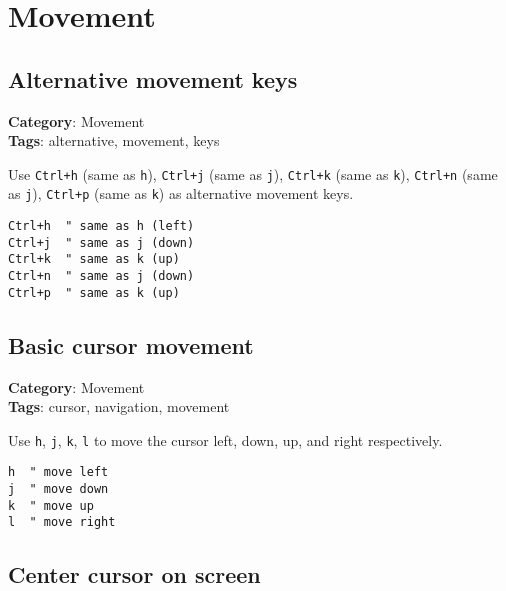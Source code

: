{{{{{{{\chapter{Movement}
\section{Alternative movement keys}

\textbf{Category}: Movement\\ \textbf{Tags}: alternative, movement, keys
\vspace{0.5cm}

Use {\footnotesize \Verb§Ctrl+h§} (same as {\footnotesize \Verb§h§}), {\footnotesize \Verb§Ctrl+j§} (same as {\footnotesize \Verb§j§}), {\footnotesize \Verb§Ctrl+k§} (same as {\footnotesize \Verb§k§}), {\footnotesize \Verb§Ctrl+n§} (same as {\footnotesize \Verb§j§}), {\footnotesize \Verb§Ctrl+p§} (same as {\footnotesize \Verb§k§}) as alternative movement keys.

\begin{Exa*}{}
\begin{Verbatim}[fontsize=\footnotesize, breaklines, breakanywhere]
Ctrl+h  " same as h (left)
Ctrl+j  " same as j (down)  
Ctrl+k  " same as k (up)
Ctrl+n  " same as j (down)
Ctrl+p  " same as k (up)
\end{Verbatim}
\end{Exa*}

\section{Basic cursor movement}

\textbf{Category}: Movement\\ \textbf{Tags}: cursor, navigation, movement
\vspace{0.5cm}

Use {\footnotesize \Verb§h§}, {\footnotesize \Verb§j§}, {\footnotesize \Verb§k§}, {\footnotesize \Verb§l§} to move the cursor left, down, up, and right respectively.

\begin{Exa*}{}
\begin{Verbatim}[fontsize=\footnotesize, breaklines, breakanywhere]
h  " move left
j  " move down
k  " move up
l  " move right
\end{Verbatim}
\end{Exa*}

\section{Center cursor on screen}

}}}}}}}
